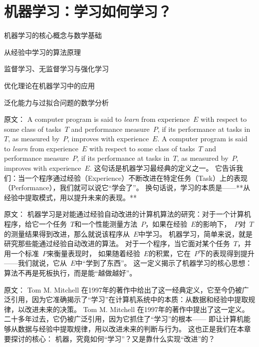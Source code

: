 \chapter{机器学习：学习如何学习？}\label{ch:机器学习}

\begin{introduction}
  \item 机器学习的核心概念与数学基础
  \item 从经验中学习的算法原理
  \item 监督学习、无监督学习与强化学习
  \item 优化理论在机器学习中的应用
  \item 泛化能力与过拟合问题的数学分析
\end{introduction}

原文：
A computer program is said to {\em learn} from experience~$E$ with respect to some class of tasks~$T$ and performance measure~$P$, if its performance at tasks in~$T$, as measured by~$P$, improves with experience~$E$.
A computer program is said to {\em learn} from experience~$E$ with respect to some class of tasks~$T$ and performance measure~$P$, if its performance at tasks in~$T$, as measured by~$P$, improves with experience~$E$.  
这句话是机器学习最经典的定义之一。  
它告诉我们：当一个程序通过经验（Experience）不断改进在特定任务（Task）上的表现（Performance），我们就可以说它“学会了”。  
换句话说，学习的本质是——**从经验中提取模式，用以提升未来的表现。**



原文：
机器学习是对能通过经验自动改进的计算机算法的研究：对于一个计算机程序，给它一个任务~$T$和一个性能测量方法~$P$，如果在经验~$E$的影响下，~$P$对~$T$的测量结果得到改进，那么就说该程序从~$E$中学习。
机器学习，简单来说，就是研究那些能通过经验自动改进的算法。  
对于一个程序，当它面对某个任务~$T$，并用一个标准~$P$来衡量表现时，  
如果随着经验~$E$的积累，它在~$P$下的表现得到提升——我们就说，它从~$E$中“学到了东西”。  
这一定义揭示了机器学习的核心思想：算法不再是死板执行，而是能“越做越好”。



原文：
Tom M. Mitchell 在1997年的著作中给出了这一经典定义，它至今仍被广泛引用，因为它准确揭示了“学习”在计算机系统中的本质：从数据和经验中提取规律，以改进未来的决策。
Tom M. Mitchell 在1997年的著作中提出了这一定义。  
二十多年过去，它仍被广泛引用，因为它抓住了“学习”的根本——  
即让计算机能够从数据与经验中提取规律，用以改进未来的判断与行为。  
这也正是我们在本章要探讨的核心：  
机器，究竟如何“学习”？又是靠什么实现“改进”的？



